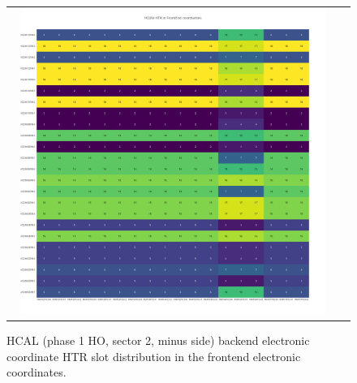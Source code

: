 \begin{figure}[htb]
 \begin{center}
  \begin{tabular}{cc}
   \includegraphics[angle=0,width=0.95\textwidth]{figures/appendix/HO2M_HTR_in_FrontEnd.png}
  \end{tabular}
  \caption{HCAL (phase 1 HO, sector 2, minus side) backend electronic coordinate HTR slot distribution in the frontend electronic coordinates.}
  \label{fig:lmapHO2MHTRFEC}
 \end{center}
\end{figure}
\clearpage

